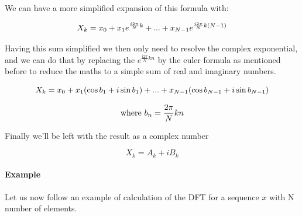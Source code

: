 \documentclass[
  oneside,
  11pt, a4paper,
  footinclude=true,
  headinclude=true,
  cleardoublepage=empty
]{scrbook}
\begin{document}
We can have a more simplified expansion of this formula with:

\begin{equation*}
    X_{k} = x_{0} + x_{1}e^{\frac{i 2 \pi}{N}k} + ... + x_{N-1}e^{\frac{i 2 \pi}{N}k(N-1)} \\
\end{equation*}

Having this sum simplified we then only need to resolve the complex exponential, and we can do that by replacing the \(e^{\frac{i 2 \pi}{N}kn}\) by the euler formula as mentioned before to reduce the maths to a simple sum of real and imaginary numbers.

\begin{equation} \label{dft_reduction}
    X_{k} = x_{0} + x_{1} (\cos{b_{1}} + i\sin{b_{1}}) + ... + x_{N-1} (\cos{b_{N-1}} + i\sin{b_{N-1}}) \\
\end{equation}

\begin{equation*}
    \text{where } \\ b_{n} = \frac{ 2 \pi}{N}kn \\
\end{equation*}


Finally we'll be left with the result as a complex number

\begin{equation*}
    X_{k} = A_{k} + i B_{k}
\end{equation*}


\paragraph{Example} \label{example1} Let us now follow an example of calculation of the DFT for a sequence \(x\) with N number of elements.
\end{document}
